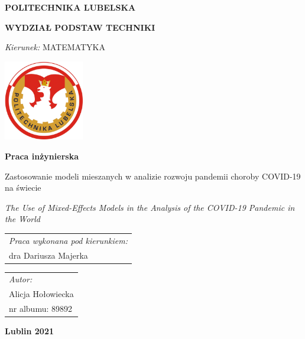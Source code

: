 \documentclass[12pt]{mwbk}
\theoremstyle{plain}
\theoremstyle{definition}
\theoremstyle{remark}
\begin{document}

\thispagestyle{empty}  %


\newcommand\tytul{Zastosowanie modeli mieszanych w analizie rozwoju pandemii choroby COVID-19 na świecie}

\newcommand\tytulangielski{The Use of Mixed-Effects Models in the Analysis of the COVID-19 Pandemic in the World}


\begin{center}


{\large \bf POLITECHNIKA LUBELSKA}

{\bf WYDZIAŁ PODSTAW TECHNIKI}

\emph{Kierunek:} MATEMATYKA


\vfill %
     

\includegraphics[width=3.5cm]{rys/logopl}

\vfill

\textbf{Praca inżynierska}

\vfill
\vfill
\vfill

\large
\tytul

\vfill

\emph{\tytulangielski}


\vfill
\vfill
\vfill
\vfill
\vfill

\begin{tabular}[t]{l}
\emph{Praca wykonana pod kierunkiem:}
\\
dra Dariusza Majerka
\end{tabular}
\hfill
\begin{tabular}[t]{l}
	\emph{Autor:}
\\
Alicja Hołowiecka\\
nr albumu: 89892 
\end{tabular}

\vfill
\vfill
\vfill

\textbf{Lublin 2021}

\end{center}
\end{document}
